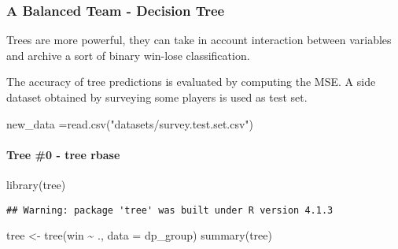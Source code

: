 \documentclass[
]{article}
\newenvironment{Shaded}{\begin{snugshade}}{\end{snugshade}}
\newcommand{\AttributeTok}[1]{\textcolor[rgb]{0.77,0.63,0.00}{#1}}
\newcommand{\DecValTok}[1]{\textcolor[rgb]{0.00,0.00,0.81}{#1}}
\newcommand{\FunctionTok}[1]{\textcolor[rgb]{0.00,0.00,0.00}{#1}}
\newcommand{\NormalTok}[1]{#1}
\newcommand{\OtherTok}[1]{\textcolor[rgb]{0.56,0.35,0.01}{#1}}
\newcommand{\SpecialCharTok}[1]{\textcolor[rgb]{0.00,0.00,0.00}{#1}}
\newcommand{\StringTok}[1]{\textcolor[rgb]{0.31,0.60,0.02}{#1}}
\begin{document}
\hypertarget{a-balanced-team---decision-tree}{%
\subsubsection{A Balanced Team - Decision
Tree}\label{a-balanced-team---decision-tree}}

Trees are more powerful, they can take in account interaction between
variables and archive a sort of binary win-lose classification.

\begin{Shaded}
\end{Shaded}

The accuracy of tree predictions is evaluated by computing the MSE. A
side dataset obtained by surveying some players is used as test set.

\begin{Shaded}
\begin{Highlighting}[]
\NormalTok{new\_data }\OtherTok{=}\FunctionTok{read.csv}\NormalTok{(}\StringTok{"datasets/survey.test.set.csv"}\NormalTok{)}
\end{Highlighting}
\end{Shaded}

\hypertarget{tree-0---tree-rbase}{%
\paragraph{Tree \#0 - tree rbase}\label{tree-0---tree-rbase}}

\begin{Shaded}
\begin{Highlighting}[]
\FunctionTok{library}\NormalTok{(tree)}
\end{Highlighting}
\end{Shaded}

\begin{verbatim}
## Warning: package 'tree' was built under R version 4.1.3
\end{verbatim}

\begin{Shaded}
\begin{Highlighting}[]
\NormalTok{tree }\OtherTok{\textless{}{-}} \FunctionTok{tree}\NormalTok{(win }\SpecialCharTok{\textasciitilde{}}\NormalTok{ ., }\AttributeTok{data =}\NormalTok{ dp\_group)}
\FunctionTok{summary}\NormalTok{(tree)}
\end{Highlighting}
\end{Shaded}
\end{document}
